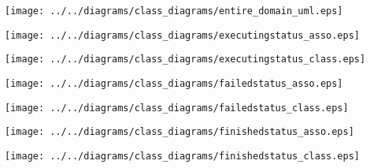     \begin{frame}
    \begin{center}
    \texttt{[image: ../../diagrams/class\_diagrams/entire\_domain\_uml.eps]}
    \end{center}
    \end{frame}
    

    \begin{frame}
    \begin{center}
    \texttt{[image: ../../diagrams/class\_diagrams/executingstatus\_asso.eps]}
    \end{center}
    \end{frame}
    

    \begin{frame}
    \begin{center}
    \texttt{[image: ../../diagrams/class\_diagrams/executingstatus\_class.eps]}
    \end{center}
    \end{frame}
    

    \begin{frame}
    \begin{center}
    \texttt{[image: ../../diagrams/class\_diagrams/failedstatus\_asso.eps]}
    \end{center}
    \end{frame}
    

    \begin{frame}
    \begin{center}
    \texttt{[image: ../../diagrams/class\_diagrams/failedstatus\_class.eps]}
    \end{center}
    \end{frame}
    

    \begin{frame}
    \begin{center}
    \texttt{[image: ../../diagrams/class\_diagrams/finishedstatus\_asso.eps]}
    \end{center}
    \end{frame}
    

    \begin{frame}
    \begin{center}
    \texttt{[image: ../../diagrams/class\_diagrams/finishedstatus\_class.eps]}
    \end{center}
    \end{frame}
    

